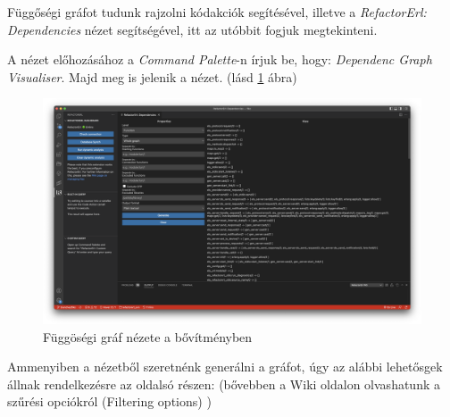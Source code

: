 Függőségi gráfot tudunk rajzolni kódakciók segítésével, illetve a \textit{RefactorErl: Dependencies} nézet segítségével, itt az utóbbit fogjuk megtekinteni.

A nézet előhozásához a \textit{Command Palette}-n írjuk be, hogy: \textit{Dependenc Graph Visualiser}. Majd meg is jelenik a nézet. (lásd \ref{fig:depGraphView} ábra)

\begin{figure}[H]
  \centering
  \includegraphics[width=\linewidth, clip=true, trim = 0mm 0mm 200mm 0mm]{images/dependency.png}
  \caption{Függöségi gráf nézete a bővítményben}
  \label{fig:depGraphView}
\end{figure}

Ammenyiben a nézetből szeretnénk generálni a gráfot, úgy az alábbi lehetősgek állnak rendelkezésre az oldalsó részen: (bővebben a Wiki oldalon olvashatunk a szűrési opciókról (Filtering options) \cite{referlWikiDependency})

